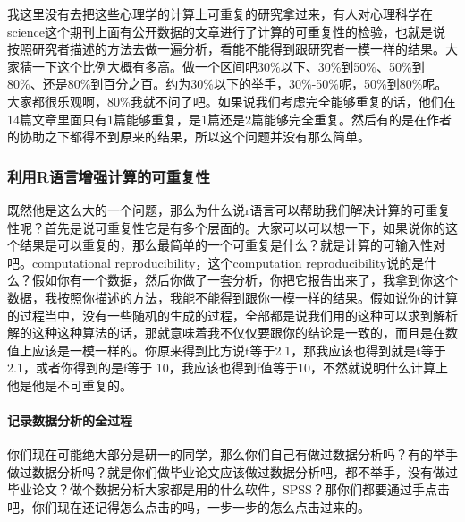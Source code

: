 \documentclass[
  oneside]{book}
\begin{document}
我这里没有去把这些心理学的计算上可重复的研究拿过来，有人对心理科学在science这个期刊上面有公开数据的文章进行了计算的可重复性的检验，也就是说按照研究者描述的方法去做一遍分析，看能不能得到跟研究者一模一样的结果。大家猜一下这个比例大概有多高。做一个区间吧30\%以下、30\%到50\%、50\%到80\%、还是80\%到百分之百。约为30\%以下的举手，30\%-50\%呢，50\%到80\%呢。大家都很乐观啊，80\%我就不问了吧。如果说我们考虑完全能够重复的话，他们在14篇文章里面只有1篇能够重复，是1篇还是2篇能够完全重复。然后有的是在作者的协助之下都得不到原来的结果，所以这个问题并没有那么简单。

\hypertarget{ux5229ux7528rux8bedux8a00ux589eux5f3aux8ba1ux7b97ux7684ux53efux91cdux590dux6027}{%
\subsubsection{利用R语言增强计算的可重复性}\label{ux5229ux7528rux8bedux8a00ux589eux5f3aux8ba1ux7b97ux7684ux53efux91cdux590dux6027}}

既然他是这么大的一个问题，那么为什么说r语言可以帮助我们解决计算的可重复性呢？首先是说可重复性它是有多个层面的。大家可以可以想一下，如果说你的这个结果是可以重复的，那么最简单的一个可重复是什么？就是计算的可输入性对吧。computational reproducibility，这个computation reproducibility说的是什么？假如你有一个数据，然后你做了一套分析，你把它报告出来了，我拿到你这个数据，我按照你描述的方法，我能不能得到跟你一模一样的结果。假如说你的计算的过程当中，没有一些随机的生成的过程，全部都是说我们用的这种可以求到解析解的这种这种算法的话，那就意味着我不仅仅要跟你的结论是一致的，而且是在数值上应该是一模一样的。你原来得到比方说t等于2.1，那我应该也得到就是t等于2.1，或者你得到的是f等于 10，我应该也得到f值等于10，不然就说明什么计算上他是他是不可重复的。

\hypertarget{ux8bb0ux5f55ux6570ux636eux5206ux6790ux7684ux5168ux8fc7ux7a0b}{%
\paragraph{\texorpdfstring{\textbf{记录数据分析的全过程}}{记录数据分析的全过程}}\label{ux8bb0ux5f55ux6570ux636eux5206ux6790ux7684ux5168ux8fc7ux7a0b}}

你们现在可能绝大部分是研一的同学，那么你们自己有做过数据分析吗？有的举手做过数据分析吗？就是你们做毕业论文应该做过数据分析吧，都不举手，没有做过毕业论文？做个数据分析大家都是用的什么软件，SPSS？那你们都要通过手点击吧，你们现在还记得怎么点击的吗，一步一步的怎么点击过来的。
\end{document}
